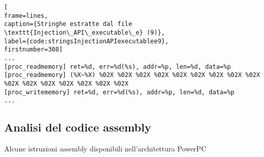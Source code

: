 \documentclass[10pt,a4paper, titlepage]{report}
\begin{document}
\begin{lstlisting}[
frame=lines, 
caption={Stringhe estratte dal file \texttt{Injection\_API\_executable\_e} (9)}, 
label={code:stringsInjectionAPIexecutablee9},
firstnumber=308]
...
[proc_readmemory] ret=%d, err=%d(%s), addr=%p, len=%d, data=%p
[proc_readmemory] (%X~%X) %02X %02X %02X %02X %02X %02X %02X %02X %02X %02X %02X %02X %02X %02X %02X %02X
[proc_writememory] ret=%d, err=%d(%s), addr=%p, len=%d, data=%p
...
\end{lstlisting}


	\newpage
\subsection{Analisi del codice assembly}
	
	\begin{table}[h!]
	    \caption{Alcune istruzioni assembly disponibili nell'architettura PowerPC\texttrademark}
	    \centering
	    

\end{table}
\end{document}
